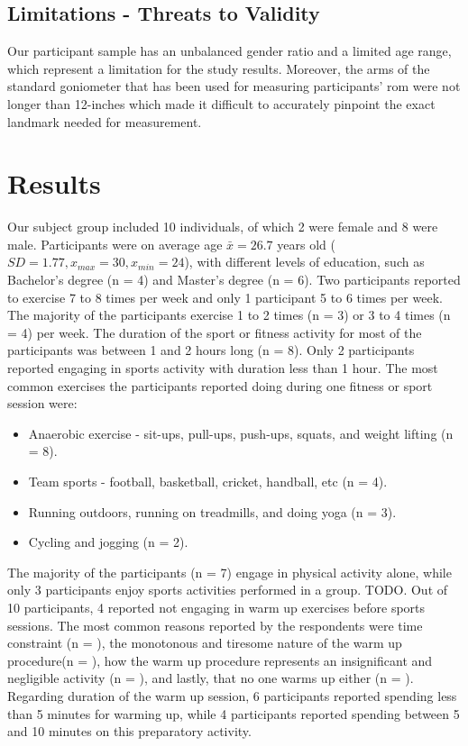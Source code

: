 \subsection{Limitations - Threats to Validity}
Our participant sample has an unbalanced gender ratio and a limited age range, which represent a limitation for the study results. Moreover, the arms of the standard goniometer that has been used for measuring participants' \acrshort{rom} were not longer than 12-inches which made it difficult to accurately pinpoint the exact landmark needed for measurement.
\section{Results}
Our subject group included 10 individuals, of which 2 were female and 8 were male. Participants were on average age \begin{math}\bar{x} = 26.7\end{math} years old (\begin{math}SD= 1.77,  x_{max}=30 ,x_{min}= 24 \end{math}), with different levels of education, such as Bachelor's degree (n = 4) and Master's degree (n = 6). Two participants reported to exercise 7 to 8 times per week and only 1 participant 5 to 6 times per week. The majority of the participants exercise 1 to 2 times (n = 3) or 3 to 4 times (n = 4) per week. The duration of the sport or fitness activity for most of the participants was between 1 and 2 hours long (n = 8). Only 2 participants reported engaging in sports activity with duration less than 1 hour. The most common exercises the participants reported doing during one fitness or sport session were:
\begin{itemize}
\item Anaerobic exercise - sit-ups, pull-ups, push-ups, squats, and weight lifting (n = 8).
\item Team sports - football, basketball, cricket, handball, etc (n = 4).
\item Running outdoors, running on treadmills, and doing yoga (n = 3).
\item Cycling and jogging (n = 2).
\end{itemize}
The majority of the participants (n = 7) engage in physical activity alone, while only 3 participants enjoy sports activities performed in a group. TODO. Out of 10 participants, 4 reported not engaging in warm up exercises before sports sessions. The most common reasons reported by the respondents were time constraint (n = ), the monotonous and tiresome nature of the warm up procedure(n = ), how the warm up procedure represents an insignificant and negligible activity (n = ), and lastly, that no one warms up either (n = ). Regarding duration of the warm up session, 6 participants reported spending less than 5 minutes for warming up, while 4 participants reported spending between 5 and 10 minutes on this preparatory activity.\\
